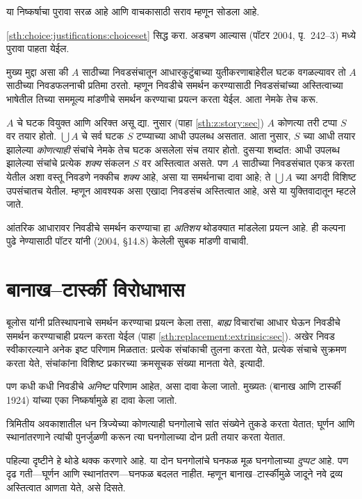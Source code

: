 या निष्कर्षाचा पुरावा सरळ आहे आणि वाचकासाठी सराव म्हणून सोडला आहे.

\begin{prob}
\ref{sth:choice:justifications:choiceset} सिद्ध करा. अडचण आल्यास (पॉटर 2004, पृ.~242--3) मध्ये पुरावा पाहता येईल.
\end{prob}

मुख्य मुद्दा असा की $A$ साठीच्या निवडसंचातून आधारकुटुंबाच्या युतीकरणाबाहेरील घटक वगळल्यावर तो $A$ साठीच्या निवडफलनाची प्रतिमा ठरतो. म्हणून निवडीचे समर्थन करण्यासाठी निवडसंचांच्या अस्तित्वाच्या भाषेतील तिच्या सममूल्य मांडणीचे समर्थन करण्याचा प्रयत्न करता येईल. आता नेमके तेच करू.

$A$ चे घटक वियुक्त आणि अरिक्त असू द्या. \stageshier{} नुसार (पाहा \ref{sth:z:story:sec}) $A$ कोणत्या तरी टप्पा $S$ वर तयार होतो. $\bigcup A$ चे सर्व घटक $S$ टप्प्याच्या आधी उपलब्ध असतात. आता \stagesacc{} नुसार, $S$ च्या आधी तयार झालेल्या \emph{कोणत्याही} संचांचे नेमके तेच घटक असलेला संच तयार होतो. दुसऱ्या शब्दांत: आधी उपलब्ध झालेल्या संचांचे प्रत्येक \emph{शक्य} संकलन $S$ वर अस्तित्वात असते. पण $A$ साठीच्या निवडसंचात एकत्र करता येतील अशा वस्तू निवडणे नक्कीच \emph{शक्य} आहे, असा या समर्थनाचा दावा आहे; ते $\bigcup A$ च्या अगदी विशिष्ट उपसंचातच येतील. म्हणून आवश्यक असा एखादा निवडसंच अस्तित्वात आहे, असे या युक्तिवादातून म्हटले जाते.

आंतरिक आधारावर निवडीचे समर्थन करण्याचा हा \emph{अतिशय} थोडक्यात मांडलेला प्रयत्न आहे. ही कल्पना पुढे नेण्यासाठी पॉटर यांनी (2004, \S14.8) केलेली सुबक मांडणी वाचावी.







\section{बानाख--टार्स्की विरोधाभास}\label{sth:choice:banach:sec}

बूलोस यांनी प्रतिस्थापनाचे समर्थन करण्याचा प्रयत्न केला तसा, \emph{बाह्य} विचारांचा आधार घेऊन निवडीचे समर्थन करण्याचाही प्रयत्न करता येईल (पाहा \ref{sth:replacement:extrinsic:sec}). अखेर निवड स्वीकारल्याने अनेक इष्ट परिणाम मिळतात: प्रत्येक संचांकाची तुलना करता येते, प्रत्येक संचाचे सुक्रमण करता येते, संचांकांना विशिष्ट प्रकारच्या क्रमसूचक संख्या मानता येते, इत्यादी.

पण कधी कधी निवडीचे \emph{अनिष्ट} परिणाम आहेत, असा दावा केला जातो. मुख्यतः (बानाख आणि टार्स्की 1924) यांच्या एका निष्कर्षामुळे हा दावा केला जातो.

\begin{thm}[बानाख--टार्स्की विरोधाभास ($\ZFC$ मध्ये)]
त्रिमितीय अवकाशातील धन त्रिज्येच्या कोणत्याही घनगोलाचे सांत संख्येने तुकडे करता येतात; घूर्णन आणि स्थानांतरणाने त्यांची पुनर्जुळणी करून त्या घनगोलाच्या दोन प्रती तयार करता येतात.
\end{thm}
\noindent
पहिल्या दृष्टीने हे थोडे थक्क करणारे आहे. या दोन घनगोलांचे घनफळ मूळ घनगोलाच्या \emph{दुप्पट} आहे. पण दृढ गती---घूर्णन आणि स्थानांतरण---घनफळ बदलत नाहीत. म्हणून बानाख--टार्स्कीमुळे जादूने नवे द्रव्य अस्तित्वात आणता येते, असे दिसते.

